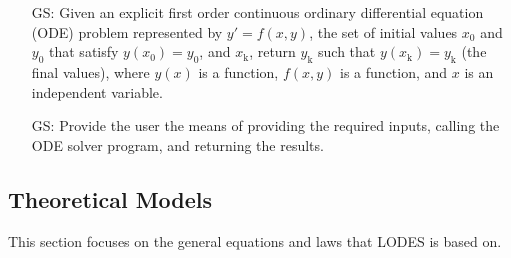 \documentclass[12pt]{article}
\newcounter{goalnum} %
\newcommand{\famname}{LODES} %
\begin{document}
\begin{itemize}

\item[GS\refstepcounter{goalnum}\thegoalnum \label{G_SolveForY}:]{
Given an explicit first order continuous ordinary differential equation (ODE) problem
represented by $y'= f(x,y)$, the set of initial
values $x_\text{0}$ and $y_\text{0}$ that satisfy $y(x_\text{0}) = y_\text{0}$,
and $x_\text{k}$, return $y_\text{k}$ such that $y(x_\text{k}) = y_\text{k}$ (the final
values), where $y(x)$ is a function, $f(x,y)$ is a function, and $x$
is an independent variable.}

\item[GS\refstepcounter{goalnum}\thegoalnum \label{G_InputOutput}:]{
Provide the user the means of providing the required inputs, calling the ODE solver
program, and returning the results.}

\end{itemize}

\subsection{Theoretical Models} \label{sec_theoretical}

This section focuses on the general equations and laws that \famname{} is based
on.

~\newline
\end{document}
